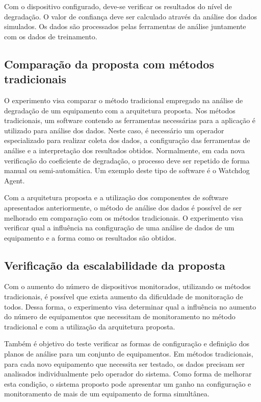 Com o dispositivo configurado, deve-se verificar os resultados do nível de degradação. O valor de
confiança deve ser calculado através da análise dos dados simulados. Os dados são processados pelas
ferramentas de análise juntamente com os dados de treinamento.


\subsection{Comparação da proposta com métodos tradicionais}
\label{sub:experimentos-metodos-tradicionais}

O experimento visa comparar o método tradicional empregado na análise de degradação de um
equipamento com a arquitetura proposta. Nos métodos tradicionais, um software contendo as
ferramentas necessárias para a aplicação é utilizado para análise dos dados. Neste caso, é
necessário um operador especializado para realizar coleta dos dados, a configuração das ferramentas
de análise e a interpretação dos resultados obtidos. Normalmente, em cada nova verificação do
coeficiente de degradação, o processo deve ser repetido de forma manual ou semi-automática. Um
exemplo deste tipo de software é o Watchdog Agent.

Com a arquitetura proposta e a utilização dos componentes de software apresentados anteriormente, o
método de análise dos dados é possível de ser melhorado em comparação com os métodos tradicionais. O
experimento visa verificar qual a influência na configuração de uma análise de dados de um
equipamento e a forma como os resultados são obtidos.


\subsection{Verificação da escalabilidade da proposta}
\label{sub:experimentos-escalabilidade}

Com o aumento do número de dispositivos monitorados, utilizando os métodos tradicionais, é possível
que exista aumento da dificuldade de monitoração de todos. Dessa forma, o experimento visa
determinar qual a influência no aumento do número de equipamentos que necessitam de monitoramento no
método tradicional e com a utilização da arquitetura proposta.

Também é objetivo do teste verificar as formas de configuração e definição dos planos de análise
para um conjunto de equipamentos. Em métodos tradicionais, para cada novo equipamento que necessita
ser testado, os dados precisam ser analisados individualmente pelo operador do sistema. Como forma
de melhorar esta condição, o sistema proposto pode apresentar um ganho na configuração e
monitoramento de mais de um equipamento de forma simultânea.
